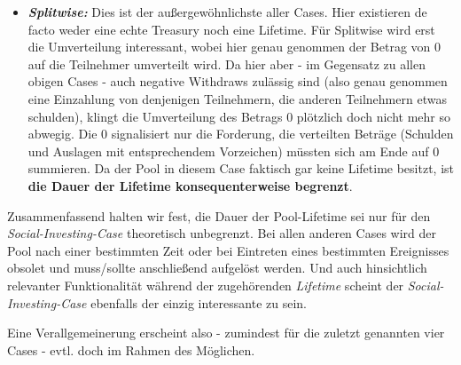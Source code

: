 \begin{itemize}
  \item \textbf{\textit{Splitwise:}} Dies ist der außergewöhnlichste aller Cases. Hier existieren de facto weder eine echte Treasury noch eine Lifetime. Für Splitwise wird erst die Umverteil\-ung interessant, wobei hier genau genommen der Betrag von 0 auf die Teilnehmer umverteilt wird. Da hier aber - im Gegensatz zu allen obigen Cases - auch negative Withdraws zulässig sind (also genau genommen eine Einzahlung von denjenigen Teilnehmern, die anderen Teilnehmern etwas schulden), klingt die Umverteilung des Betrags 0 plötzlich doch nicht mehr so abwegig. Die 0 signalisiert nur die Forderung, die verteilten Beträge (Schulden und Auslagen mit entsprechendem Vorzeichen) müssten sich am Ende auf 0 summieren. Da der Pool in diesem Case faktisch gar keine Lifetime besitzt, ist \textbf{die Dauer der Lifetime konsequenterweise begrenzt}.
\end{itemize}

\vspace{0.3cm}

Zusammenfassend halten wir fest, die Dauer der Pool-Lifetime sei nur für den \textit{Social-Investing-Case} theoretisch unbegrenzt. Bei allen anderen Cases wird der Pool nach einer bestimmten Zeit oder bei Eintreten eines bestimmten Ereignisses obsolet und muss/sollte anschließend aufgelöst werden. Und auch hinsichtlich relevanter Funktionalität während der zugehörenden \textit{Lifetime} scheint der \textit{Social-Investing-Case} ebenfalls der einzig interessante zu sein. 

\vspace{0.1cm}

Eine Verallgemeinerung erscheint also - zumindest für die zuletzt genannten vier Cases - evtl. doch im Rahmen des Möglichen. 

\vspace{0.3cm}


\vspace{0.5cm}